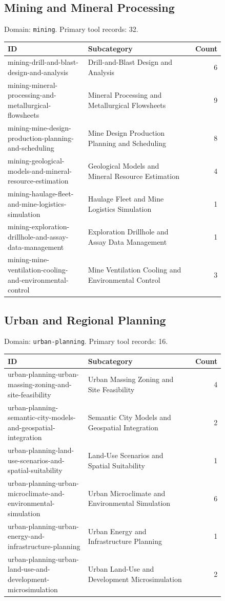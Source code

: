 \subsection{Mining and Mineral Processing}
\noindent Domain: \texttt{mining}. Primary tool records: 32.
\begin{longtable}{p{0.37\linewidth}p{0.47\linewidth}r}
ID & Subcategory & Count\\\hline\endhead
mining-drill-and-blast-design-and-analysis & Drill-and-Blast Design and Analysis & 6\\
mining-mineral-processing-and-metallurgical-flowsheets & Mineral Processing and Metallurgical Flowsheets & 9\\
mining-mine-design-production-planning-and-scheduling & Mine Design Production Planning and Scheduling & 8\\
mining-geological-models-and-mineral-resource-estimation & Geological Models and Mineral Resource Estimation & 4\\
mining-haulage-fleet-and-mine-logistics-simulation & Haulage Fleet and Mine Logistics Simulation & 1\\
mining-exploration-drillhole-and-assay-data-management & Exploration Drillhole and Assay Data Management & 1\\
mining-mine-ventilation-cooling-and-environmental-control & Mine Ventilation Cooling and Environmental Control & 3\\
\end{longtable}
\subsection{Urban and Regional Planning}
\noindent Domain: \texttt{urban-planning}. Primary tool records: 16.
\begin{longtable}{p{0.37\linewidth}p{0.47\linewidth}r}
ID & Subcategory & Count\\\hline\endhead
urban-planning-urban-massing-zoning-and-site-feasibility & Urban Massing Zoning and Site Feasibility & 4\\
urban-planning-semantic-city-models-and-geospatial-integration & Semantic City Models and Geospatial Integration & 2\\
urban-planning-land-use-scenarios-and-spatial-suitability & Land-Use Scenarios and Spatial Suitability & 1\\
urban-planning-urban-microclimate-and-environmental-simulation & Urban Microclimate and Environmental Simulation & 6\\
urban-planning-urban-energy-and-infrastructure-planning & Urban Energy and Infrastructure Planning & 1\\
urban-planning-urban-land-use-and-development-microsimulation & Urban Land-Use and Development Microsimulation & 2\\
\end{longtable}
